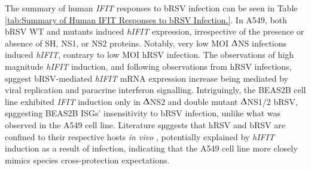 \begin{table}
     \caption[Summary of Human \textit{IFIT} Responses to hRSV Infection.]{\textbf{Summary of Human \textit{IFIT} Responses to hRSV Infection.} Trend arrows indicate abundance relative to mock-treated values: strong downregulation ($\downarrow$, 0.062-0.25); mild downregulation ($\searrow$, 0.25-0.5); no difference ($\rightarrow$, 0.5-1.5); mild upregulation ($\nearrow$, 1.5-4); moderate upregulation ($\uparrow$, 4-64); strong upregulation ($\uparrow\uparrow$, 64-258); very strong upregulation ($\uparrow\uparrow\uparrow$, 258-1024).}
    \label{tab:Summary of Human IFIT Responses to hRSV Infection.}
\end{table}

The summary of human \textit{IFIT} responses to bRSV infection can be seen in Table \ref{tab:Summary of Human IFIT Responses to bRSV Infection.}. In A549, both bRSV WT and mutants induced \textit{hIFIT} expression, irrespective of the presence or absence of SH, NS1, or NS2 proteins. Notably, very low MOI $\Updelta$NS infections induced \textit{hIFIT}, contrary to low MOI hRSV infection. The observations of high magnitude \textit{hIFIT} induction, and following observations from hRSV infections, sµggest bRSV-mediated \textit{hIFIT} mRNA expression increase being mediated by viral replication and paracrine interferon signalling. Intriguingly, the BEAS2B cell line exhibited \textit{IFIT} induction only in $\Updelta$NS2 and double mutant $\Updelta$NS1/2 bRSV, sµggesting BEAS2B ISGs' insensitivity to bRSV infection, unlike what was observed in the A549 cell line. Literature sµggests that hRSV and bRSV are confined to their respective hosts \textit{in vivo} \cite{Buchholz2000ChimericVaccine}, potentially explained by \textit{hIFIT} induction as a result of infection, indicating that the A549 cell line more closely mimics species cross-protection expectations.

